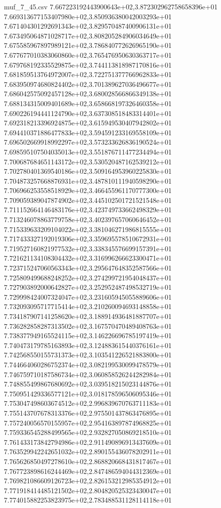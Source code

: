 \begin{filecontents*}{muf_7_45.csv}
7.667223192443900643e+02,3.872302962758658396e+01
7.669313677153407980e+02,3.850936380042003293e+01
7.671404301292691343e+02,3.829570487400906131e+01
7.673495064871028717e+02,3.808205284906034649e+01
7.675585967897989121e+02,3.786840772626965190e+01
7.677677010383060860e+02,3.765476950630363717e+01
7.679768192335529875e+02,3.744113818987170816e+01
7.681859513764972007e+02,3.722751377766962833e+01
7.683950974680824402e+02,3.701389627036496677e+01
7.686042575092457128e+02,3.680028566866349138e+01
7.688134315009401689e+02,3.658668197326460358e+01
7.690226194441124790e+02,3.637308518483314401e+01
7.692318213396924875e+02,3.615949530407942802e+01
7.694410371886477833e+02,3.594591233169558109e+01
7.696502669918992297e+02,3.573233626836190524e+01
7.698595107504035013e+02,3.551876711477234494e+01
7.700687684651143172e+02,3.530520487162539212e+01
7.702780401369540186e+02,3.509164953960225830e+01
7.704873257668876931e+02,3.487810111940598290e+01
7.706966253558518929e+02,3.466455961170777300e+01
7.709059389047874902e+02,3.445102501721521548e+01
7.711152664146483176e+02,3.423749733662498329e+01
7.713246078863779758e+02,3.402397657060646452e+01
7.715339633209104022e+02,3.381046271986815555e+01
7.717433327192019306e+02,3.359695578510672931e+01
7.719527160821977532e+02,3.338345576699157391e+01
7.721621134108304432e+02,3.316996266623300471e+01
7.723715247060563343e+02,3.295647648352587566e+01
7.725809499688248252e+02,3.274299721954048437e+01
7.727903892000642827e+02,3.252952487498532719e+01
7.729998424007324047e+02,3.231605945055889606e+01
7.732093095717715414e+02,3.210260094693148858e+01
7.734187907141258620e+02,3.188914936481887707e+01
7.736282858287313502e+02,3.167570470489408763e+01
7.738377949165524115e+02,3.146226696785197419e+01
7.740473179785163893e+02,3.124883615440376161e+01
7.742568550155731373e+02,3.103541226521883800e+01
7.744664060286752374e+02,3.082199530099478579e+01
7.746759710187586734e+02,3.060858526244282984e+01
7.748855499867680692e+02,3.039518215023144876e+01
7.750951429336577121e+02,3.018178596506095346e+01
7.753047498603674512e+02,2.996839670763711183e+01
7.755143707678313376e+02,2.975501437863476895e+01
7.757240056570155957e+02,2.954163897874968825e+01
7.759336545288499565e+02,2.932827050869218510e+01
7.761433173842794986e+02,2.911490896913437609e+01
7.763529942242651032e+02,2.890155436078202911e+01
7.765626850497278610e+02,2.868820668431817467e+01
7.767723898616244469e+02,2.847486594044312369e+01
7.769821086609126723e+02,2.826153212985354912e+01
7.771918414485121502e+02,2.804820525323430047e+01
7.774015882253823975e+02,2.783488531128114118e+01

\end{filecontents*}
